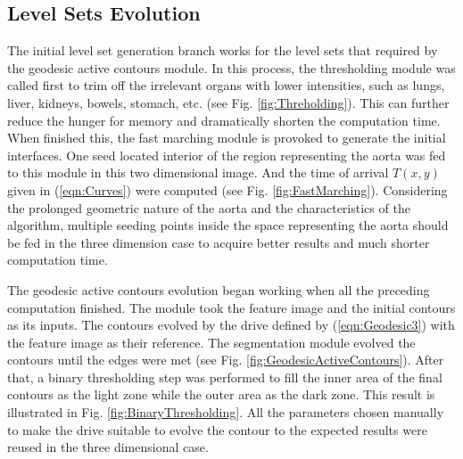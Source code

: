 \subsection{Level Sets Evolution}
The initial level set generation branch works for the level sets that required by the geodesic active contours module.
In this process, the thresholding module was called first to trim off the irrelevant organs with lower intensities, such as lungs, liver, kidneys, bowels, stomach, etc. (see Fig. \ref{fig:Threholding}).
This can further reduce the hunger for memory and dramatically shorten the computation time.
When finished this, the fast marching module is provoked to generate the initial interfaces.
One seed located interior of the region representing the aorta was fed to this module in this two dimensional image.
And the time of arrival $T(x,y)$ given in (\ref{eqn:Curves}) were computed (see Fig. \ref{fig:FastMarching}).
Considering the prolonged geometric nature of the aorta and the characteristics of the algorithm, multiple seeding points inside the space representing the aorta should be fed in the three dimension case to acquire better results and much shorter computation time.

The geodesic active contours evolution began working when all the preceding computation finished.
The module took the feature image and the initial contours as its inputs.
The contours evolved by the drive defined by (\ref{eqn:Geodesic3}) with the feature image as their reference.
The segmentation module evolved the contours until the edges were met (see Fig. \ref{fig:GeodesicActiveContours}).
After that, a binary thresholding step was performed to fill the inner area of the final contours as the light zone while the outer area as the dark zone.
This result is illustrated in Fig. \ref{fig:BinaryThresholding}.
All the parameters chosen manually to make the drive suitable to evolve the contour to the expected results were reused in the three dimensional case.

